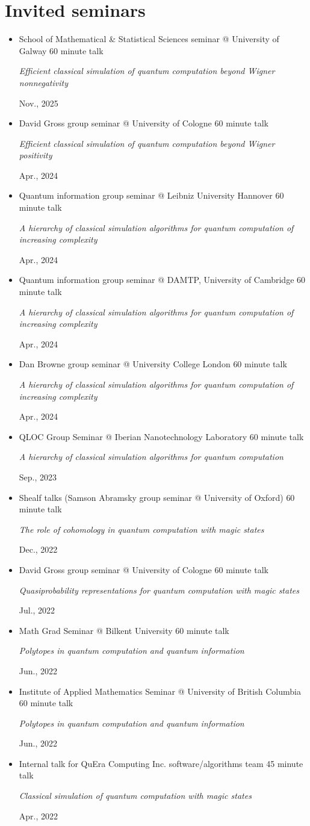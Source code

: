 \documentclass[letterpaper,11pt]{article}
\newcommand{\ConferenceItem}[4]{
	\item{\parbox{0.97\textwidth}{
		{#1} \hfill {#2}\\
		\parbox{0.86\textwidth}{\emph{#3}} \hfill {#4}
	}}
}
\begin{document}
\section*{Invited seminars}
\begin{itemize}[leftmargin=*]
	\ConferenceItem{School of Mathematical \& Statistical Sciences seminar @ University of Galway}{60 minute talk}{Efficient classical simulation of quantum computation beyond Wigner nonnegativity}{Nov., 2025}
	
	\ConferenceItem{David Gross group seminar @ University of Cologne}{60 minute talk}{Efficient classical simulation of quantum computation beyond Wigner positivity}{Apr., 2024}
	
	\ConferenceItem{Quantum information group seminar @ Leibniz University Hannover}{60 minute talk}{A hierarchy of classical simulation algorithms for quantum computation of increasing complexity}{Apr., 2024}
	
	\ConferenceItem{Quantum information group seminar @ DAMTP, University of Cambridge}{60 minute talk}{A hierarchy of classical simulation algorithms for quantum computation of increasing complexity}{Apr., 2024}
	
	\ConferenceItem{Dan Browne group seminar @ University College London}{60 minute talk}{A hierarchy of classical simulation algorithms for quantum computation of increasing complexity}{Apr., 2024}
	
	\ConferenceItem{QLOC Group Seminar @ Iberian Nanotechnology Laboratory}{60 minute talk}{A hierarchy of classical simulation algorithms for quantum computation}{Sep., 2023}
	
	\ConferenceItem{Shealf talks (Samson Abramsky group seminar @ University of Oxford)}{60 minute talk}{The role of cohomology in quantum computation with magic states}{Dec., 2022}
	
	\ConferenceItem{David Gross group seminar @ University of Cologne}{60 minute talk}{Quasiprobability representations for quantum computation with magic states}{Jul., 2022}
	
	\ConferenceItem{Math Grad Seminar @ Bilkent University}{60 minute talk}{Polytopes in quantum computation and quantum information}{Jun., 2022}
	
	\ConferenceItem{Institute of Applied Mathematics Seminar @ University of British Columbia}{60 minute talk}{Polytopes in quantum computation and quantum information}{Jun., 2022}
	
	\ConferenceItem{Internal talk for QuEra Computing Inc. software/algorithms team}{45 minute talk}{Classical simulation of quantum computation with magic states}{Apr., 2022}
\end{itemize}
\end{document}
